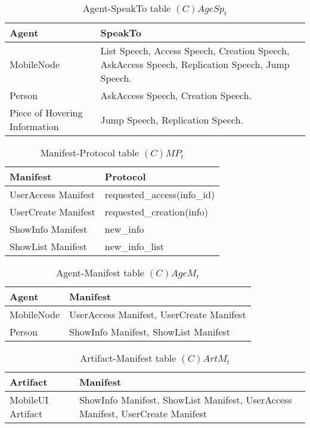\begin{table}[H]
	\centering
	\begin{tabular}{|p{4cm}|p{8cm}|}
			\hline
			\textbf{Agent} & \textbf{SpeakTo} \\
			\hline
			MobileNode & List Speech, Access Speech, Creation Speech, AskAccess Speech, Replication Speech, Jump Speech. \\
			\hline
			Person & AskAccess Speech, Creation Speech. \\
			\hline
			Piece of Hovering Information & Jump Speech, Replication Speech. \\
			\hline
		\end{tabular}
	\caption{Agent-SpeakTo table $(C)AgeSp_t$}
	\label{tab:cagespt}
\end{table}

\begin{table}[H]
	\centering
	\begin{tabular}{|p{4cm}|p{8cm}|}
			\hline
			\textbf{Manifest} & \textbf{Protocol} \\
			\hline
			UserAccess Manifest & requested\_access(info\_id) \\
			\hline
			UserCreate Manifest & requested\_creation(info) \\
			\hline
			ShowInfo Manifest & new\_info \\
			\hline
			ShowList Manifest & new\_info\_list \\
			\hline
		\end{tabular}
	\caption{Manifest-Protocol table $(C)MP_t$}
	\label{tab:cmpt}
\end{table}

\begin{table}[H]
	\centering
	\begin{tabular}{|p{4cm}|p{8cm}|}
			\hline
			\textbf{Agent} & \textbf{Manifest} \\
			\hline
			MobileNode & UserAccess Manifest, UserCreate Manifest \\
			\hline
			Person & ShowInfo Manifest, ShowList Manifest \\
			\hline
		\end{tabular}
	\caption{Agent-Manifest table $(C)AgeM_t$}
	\label{tab:cagemt}
\end{table}

\begin{table}[H]
	\centering
	\begin{tabular}{|p{4cm}|p{8cm}|}
			\hline
			\textbf{Artifact} & \textbf{Manifest} \\
			\hline
			MobileUI Artifact & ShowInfo Manifest, ShowList Manifest, UserAccess
			Manifest, UserCreate Manifest \\
			\hline
		\end{tabular}
	\caption{Artifact-Manifest table $(C)ArtM_t$}
	\label{tab:cartmt}
\end{table}

